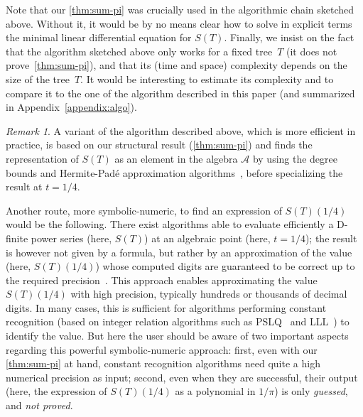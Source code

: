 \documentclass[12pt]{amsart}
\theoremstyle{plain}
\theoremstyle{remark}
\newtheorem{remark}[lemma]{Remark}
\def\cA{\mathcal{A}}
\begin{document}
Note that our \cref{thm:sum-pi} was crucially used in the algorithmic chain sketched above. Without it, it would be by no means clear how to solve in explicit terms the minimal linear differential equation for $S(T)$. 
Finally, we insist on the fact that the algorithm sketched above only works for a fixed tree~$T$ (it does not prove~\cref{thm:sum-pi}), and that its (time and space) complexity depends on the size of the tree~$T$. It would be interesting to estimate its complexity and to compare it to the one of the algorithm described in this paper (and summarized in Appendix~\ref{appendix:algo}).

\begin{remark} \label{rem:algo_variant}
A variant of the algorithm described above, which is more efficient in practice, is based on our structural result (\cref{thm:sum-pi}) and finds the representation of $S(T)$ as an element in the algebra $\cA$ by using the degree bounds and Hermite-Padé approximation algorithms~\cite{BeLa94}, before specializing the result at $t=1/4$.

Another route, more symbolic-numeric, to find an expression of $S(T)(1/4)$ would be the following.
There exist algorithms able to evaluate efficiently a D-finite power series (here, $S(T)$) at an
algebraic point (here, $t=1/4$); the result is however not given by a formula, but rather by an
approximation of the value (here, $S(T)(1/4)$) whose computed digits are guaranteed to be correct
up to the required precision~\cite{MeSa10,Mezzarobba10}. This approach enables approximating the
value $S(T)(1/4)$ with high precision, typically hundreds or thousands of decimal digits. In many
cases, this is sufficient for algorithms performing constant recognition (based on integer
relation algorithms such as PSLQ~\cite{FeBaAr99,BaBr01} and LLL~\cite{LLL82,NoStVi11}) to identify
the value.
%
But here the user should be aware of two important aspects regarding this powerful symbolic-numeric
approach: first, even with our \cref{thm:sum-pi} at hand, constant recognition algorithms need
quite a high numerical precision as input; second, even when they are successful, their output
(here, the expression of $S(T)(1/4)$ as a polynomial in $1/\pi$) is only \emph{guessed}, and
\emph{not proved}. 
\end{remark}
\end{document}
